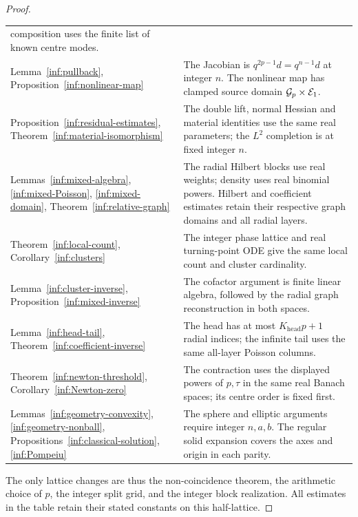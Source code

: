 \begin{proof}
\begin{longtable}{@{}>{\raggedright\arraybackslash}p{}>{\raggedright\arraybackslash}p{}@{}}
composition uses the finite list of known centre modes.\\
Lemma~\ref{inf:pullback}, Proposition~\ref{inf:nonlinear-map} &
The Jacobian is $q^{2p-1}d=q^{n-1}d$ at integer $n$.
The nonlinear map has clamped source domain $\mathcal{G}_p\times\mathcal E_1$.\\
Proposition~\ref{inf:residual-estimates},
Theorem~\ref{inf:material-isomorphism} &
The double lift, normal Hessian and material identities use the
same real parameters; the $L^2$ completion is at fixed integer $n$.\\
Lemmas~\ref{inf:mixed-algebra}, \ref{inf:mixed-Poisson},
\ref{inf:mixed-domain}, Theorem~\ref{inf:relative-graph} &
The radial Hilbert blocks use real weights; density uses real
binomial powers. Hilbert and coefficient estimates retain their
respective graph domains and all radial layers.\\
Theorem~\ref{inf:local-count}, Corollary~\ref{inf:clusters} &
The integer phase lattice and real turning-point ODE give the
same local count and cluster cardinality.\\
Lemma~\ref{inf:cluster-inverse},
Proposition~\ref{inf:mixed-inverse} &
The cofactor argument is finite linear algebra, followed by the
radial graph reconstruction in both spaces.\\
Lemma~\ref{inf:head-tail}, Theorem~\ref{inf:coefficient-inverse} &
The head has at most $K_{\mathrm{head}}p+1$ radial indices;
the infinite tail uses the same all-layer Poisson columns.\\
Theorem~\ref{inf:newton-threshold}, Corollary~\ref{inf:Newton-zero} &
The contraction uses the displayed powers of $p,\tau$ in the same
real Banach spaces; its centre order is fixed first.\\
Lemmas~\ref{inf:geometry-convexity}, \ref{inf:geometry-nonball},
Propositions~\ref{inf:classical-solution}, \ref{inf:Pompeiu} &
The sphere and elliptic arguments require integer $n,a,b$.
The regular solid expansion covers the axes and origin in each parity.\\
\bottomrule
\end{longtable}
\endgroup
The only lattice changes are thus the non-coincidence theorem,
the arithmetic choice of $p$, the integer split grid, and the
integer block realization. All estimates in the table retain their
stated constants on this half-lattice.
\end{proof}
